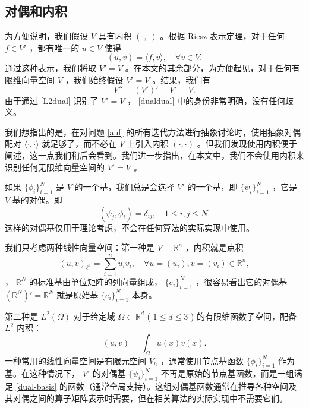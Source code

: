\documentclass[12pt]{acta_2011xz}
\begin{document}
   \subsection{对偶和内积  }    为方便说明，我们假设    $V$    具有内积    $(\cdot, \cdot)$    。根据 Riesz 表示定理，对于任何    $f\in V'$    ，都有唯一的    $u\in V$    使得
   \begin{equation}
  \label{L2dual}
(u,v) = \langle f, v\rangle, \quad \forall v\in V.   
\end{equation}    通过这种表示，我们将取    $V'=V$    。在本文的其余部分，为方便起见，对于任何有限维向量空间    $V$    ，我们始终假设    $V'=V$    。结果，我们有
   \begin{equation}
  \label{dualdual}
V''=(V')'=V'=V.  
\end{equation}    由于通过    \eqref{L2dual}    识别了    $V'=V$    ，   \eqref{dualdual}    中的身份非常明确，没有任何歧义。  

我们想指出的是，在对问题    \eqref{auf}    的所有迭代方法进行抽象讨论时，使用抽象对偶配对    $\langle\cdot, \cdot \rangle$    就足够了，而不必在    $V$    上引入内积    $(\cdot, \cdot)$   。但我们发现使用内积便于阐述，这一点我们稍后会看到。我们进一步指出，在本文中，我们不会使用内积来识别任何无限维向量空间的    $V'=V$   。  

如果    $ \{ \phi_i \} _{i=1}^N$    是    $V$    的一个基，我们总是会选择    $V'$    的一个基，即    $ \{ \psi_i \} _{i=1}^N$    ，它是    $V$    基的对偶。即    \begin{equation}
  \label{dual-basis}
(\psi_j, \phi_i)=\delta_{ij}, \quad 1\le i, j\le N.   
\end{equation}    这样的对偶基仅用于理论考虑，不会在任何算法的实际实现中使用。  

我们只考虑两种线性向量空间：第一种是    $V=\mathbb R^n$    ，内积就是点积
   $$
(u, v)_{\ell^2}=\sum_{i=1}^nu_iv_i, \quad \forall u=(u_i), v=(v_i)\in \mathbb R^n, 
$$    ，    $\mathbb R^N$    的标准基由单位矩阵的列向量组成，    $ \{ e_i \} _{i=1}^N$    ，很容易看出它的对偶基    $(\mathbb R^N)'=\mathbb R^N$    就是原始基
   $ \{ e_i \} _{i=1}^N$    本身。  

第二种是    $L^2(\Omega)$    对于给定域    $\Omega\subset\mathbb R^d$    (    $1\le d\le 3$    ) 的有限维函数子空间，配备    $L^2$    内积：
   $$
(u,v)=\int_\Omega u(x)v(x).
$$    一种常用的线性向量空间是有限元空间
   $V_h$    ，通常使用节点基函数    $ \{ \phi_i \} _{i=1}^N$    作为基。在这种情况下，   $V'$    的对偶基    $ \{ \psi_i \} _{i=1}^N$    不再是原始的节点基函数，而是一组满足
   \eqref{dual-basis}    的函数（通常全局支持）。这组对偶基函数通常在推导各种空间及其对偶之间的算子矩阵表示时需要，但在相关算法的实际实现中不需要它们。  
\end{document}
